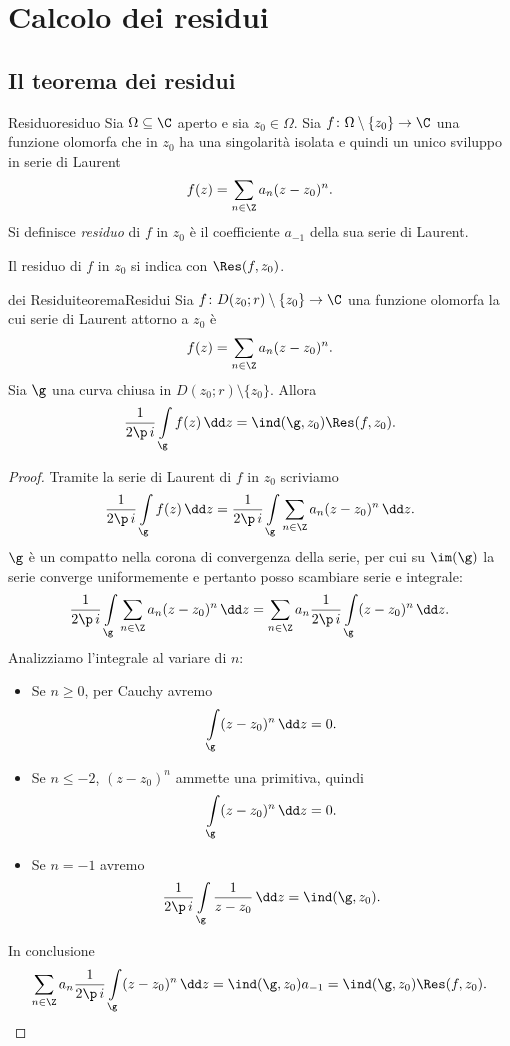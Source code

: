 \chapter{Calcolo dei residui}
\section{Il teorema dei residui}

\begin{defn}{Residuo}{residuo}
	Sia \(\Omega\subseteq \C\) aperto e sia \(z_0\in \Omega\).
	Sia \(f\colon \Omega\setminus\{z_0\} \to \C\) una funzione olomorfa che in \(z_0\) ha una singolarità isolata e quindi un unico sviluppo in serie di Laurent
	\[
		f(z) = \sum_{n\in\Z}a_n (z-z_0)^n.
	\]
	Si definisce \emph{residuo} di \(f\) in \(z_0\) è il coefficiente \(a_{-1}\) della sua serie di Laurent.
\end{defn}

\begin{notz}
	Il residuo di \(f\) in \(z_0\) si indica con \(\Res(f,z_0)\).
\end{notz}

\begin{teor}{dei Residui}{teoremaResidui}
	Sia \(f\colon D(z_0;r)\setminus\{z_0\} \to \C\) una funzione olomorfa la cui serie di Laurent attorno a \(z_0\) è
	\[
		f(z) = \sum_{n\in \Z}a_n (z-z_0)^n.
	\]
	Sia \(\g\) una curva chiusa in \(D(z_0;r)\setminus\{z_0\}\). Allora
	\[
		\frac{1}{2\p\,i}\int\limits_\g f(z)\,\dd z = \ind(\g,z_0) \Res(f,z_0).
	\]
\end{teor}

\begin{proof}
	Tramite la serie di Laurent di \(f\) in \(z_0\) scriviamo
	\[
		\frac{1}{2\p\,i} \int\limits_\g f(z)\,\dd z = \frac{1}{2\p\,i} \int\limits_\g \sum_{n\in \Z}a_n (z-z_0)^n\,\dd z.
	\]
	\(\g\) è un compatto nella corona di convergenza della serie, per cui su \(\im(\g)\) la serie converge uniformemente e pertanto posso scambiare serie e integrale:
	\[
		\frac{1}{2\p\,i} \int\limits_\g \sum_{n\in \Z}a_n(z-z_0)^n \,\dd z = \sum_{n\in \Z}a_n \frac{1}{2\p\,i} \int\limits_\g (z-z_0)^n\,\dd z.
	\]
	Analizziamo l'integrale al variare di \(n\):
	\begin{itemize}
		\item Se \(n\ge 0\), per Cauchy avremo
		      \[
			      \int\limits_\g (z-z_0)^n\,\dd z = 0.
		      \]
		\item Se \(n\le -2\), \((z-z_0)^n\) ammette una primitiva, quindi
		      \[
			      \int\limits_\g (z-z_0)^n\,\dd z = 0.
		      \]
		\item Se \(n=-1\) avremo
		      \[
			      \frac{1}{2\p\,i}\int\limits_\g \frac{1}{z-z_0}\,\dd z = \ind(\g,z_0).
		      \]
	\end{itemize}
	In conclusione
	\[
		\sum_{n\in \Z}a_n \frac{1}{2\p\,i} \int\limits_\g (z-z_0)^n\,\dd z = \ind(\g,z_0) a_{-1} = \ind(\g,z_0) \Res(f,z_0).\qedhere
	\]
\end{proof}

